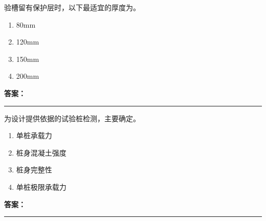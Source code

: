 \documentclass[UTF8,fontset=fandol,11pt]{ctexart}
\newcommand{\answerline}{\textcolor{answerred}{\rule{2.4cm}{0.7pt}}}
\begin{document}
\vspace{0.2em}

\begin{quizbox}[title={乱序第 40 题｜第一章土方工程}]

验槽留有保护层时，以下最适宜的厚度为。\\

\begin{enumerate}[label=\Alph*.]

\item 80mm

\item 120mm

\item 150mm

\item 200mm

\end{enumerate}

\textbf{\textcolor{answerred}{答案：}} \answerline

\end{quizbox}

\vspace{0.2em}

\begin{quizbox}[title={乱序第 41 题｜第二章桩基础工程}]

为设计提供依据的试验桩检测，主要确定。\\

\begin{enumerate}[label=\Alph*.]

\item 单桩承载力

\item 桩身混凝土强度

\item 桩身完整性

\item 单桩极限承载力

\end{enumerate}

\textbf{\textcolor{answerred}{答案：}} \answerline

\end{quizbox}

\vspace{0.2em}
\end{document}
